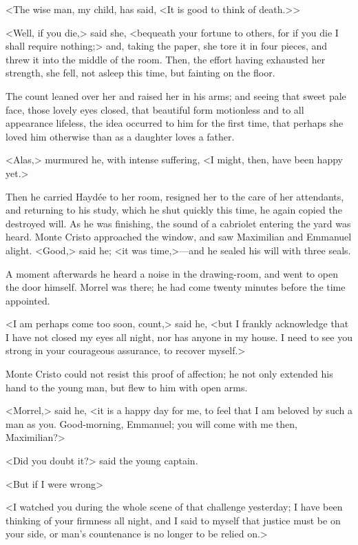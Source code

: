  <The wise man, my child, has said, <It is good to think of death.>> 

 <Well, if you die,> said she, <bequeath your fortune to others, for if you die I shall require nothing;> and, taking the paper, she tore it in four pieces, and threw it into the middle of the room. Then, the effort having exhausted her strength, she fell, not asleep this time, but fainting on the floor. 

 The count leaned over her and raised her in his arms; and seeing that sweet pale face, those lovely eyes closed, that beautiful form motionless and to all appearance lifeless, the idea occurred to him for the first time, that perhaps she loved him otherwise than as a daughter loves a father. 

 <Alas,> murmured he, with intense suffering, <I might, then, have been happy yet.> 

 Then he carried Haydée to her room, resigned her to the care of her attendants, and returning to his study, which he shut quickly this time, he again copied the destroyed will. As he was finishing, the sound of a cabriolet entering the yard was heard. Monte Cristo approached the window, and saw Maximilian and Emmanuel alight. <Good,> said he; <it was time,>—and he sealed his will with three seals. 

 A moment afterwards he heard a noise in the drawing-room, and went to open the door himself. Morrel was there; he had come twenty minutes before the time appointed. 

 <I am perhaps come too soon, count,> said he, <but I frankly acknowledge that I have not closed my eyes all night, nor has anyone in my house. I need to see you strong in your courageous assurance, to recover myself.> 

 Monte Cristo could not resist this proof of affection; he not only extended his hand to the young man, but flew to him with open arms. 

 <Morrel,> said he, <it is a happy day for me, to feel that I am beloved by such a man as you. Good-morning, Emmanuel; you will come with me then, Maximilian?> 

 <Did you doubt it?> said the young captain. 

 <But if I were wrong\longdash> 

 <I watched you during the whole scene of that challenge yesterday; I have been thinking of your firmness all night, and I said to myself that justice must be on your side, or man's countenance is no longer to be relied on.> 

